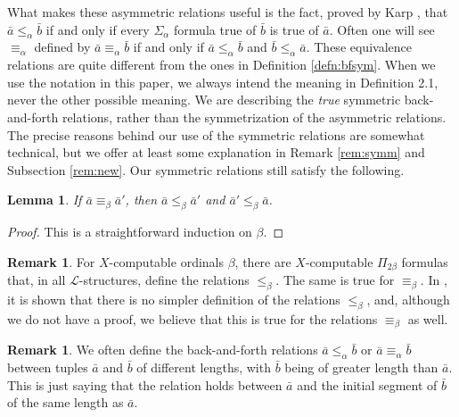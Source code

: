 \documentclass{article}
\newtheorem{lem}[thm]{Lemma}
\theoremstyle{definition}
\newtheorem{remark}[thm]{Remark}
\begin{document}
	What makes these asymmetric relations useful is the fact, proved by Karp \cite{Karp}, that $\bar{a} \leq_\alpha \bar{b}$ if and only if every $\Sigma_\alpha$ formula true of $\bar{b}$ is true of $\bar{a}$. Often one will see $\equiv_\alpha$ defined by $\bar{a} \equiv_\alpha \bar{b}$ if and only if $\bar{a} \leq_\alpha \bar{b}$ and $\bar{b} \leq_\alpha \bar{a}$. These equivalence relations are quite different from the ones in Definition \ref{defn:bfsym}. When we use the notation in this paper, we always intend the meaning in Definition 2.1, never the other possible meaning. We are describing the \textit{true} symmetric back-and-forth relations, rather than the symmetrization of the asymmetric relations. The precise reasons behind our use of the symmetric relations are somewhat technical, but we offer at least some explanation in Remark \ref{rem:symm} and Subsection \ref{rem:new}. Our symmetric relations still satisfy the following.
	
	\begin{lem}
		
		If $\bar{a}\equiv_\beta\bar{a}'$, then $\bar{a}\leq_\beta\bar{a}'$ and $\bar{a}'\leq_\beta\bar{a}$.
		
	\end{lem}
	
	\begin{proof}
		
		This is a straightforward induction on $\beta$.
	\end{proof}
	
	\begin{remark}
		For $X$-computable ordinals $\beta$, there are $X$-computable $\Pi_{2\beta}$ formulas that, in all $\mathcal{L}$-structures, define the relations $\leq_\beta$. The same is true for $\equiv_\beta$. In \cite{ChenGonzalezHT}, it is shown that there is no simpler definition of the relations $\leq_\beta$, and, although we do not have a proof, we believe that this is true for the relations $\equiv_\beta$ as well.
	\end{remark}
	
	\begin{remark}
		We often define the back-and-forth relations $\bar{a}\leq_\alpha\bar{b}$ or $\bar{a}\equiv_\alpha\bar{b}$ between tuples $\bar{a}$ and $\bar{b}$ of different lengths, with $\bar{b}$ being of greater length than $\bar{a}$. This is just saying that the relation holds between $\bar{a}$ and the initial segment of $\bar{b}$ of the same length as $\bar{a}$.
	\end{remark}
	
\end{document}
